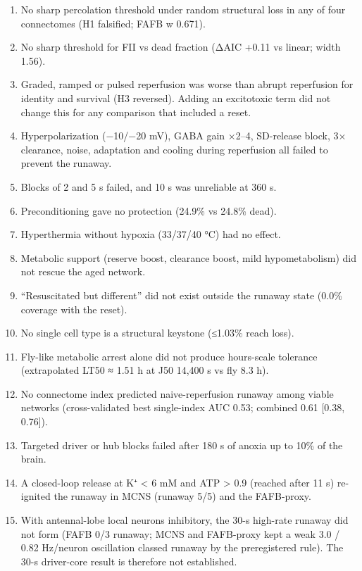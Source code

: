 \documentclass[11pt]{article}
\providecommand{\tightlist}{\setlength{\itemsep}{0pt}\setlength{\parskip}{0pt}}
\begin{document}
\begin{enumerate}
\def\labelenumi{\arabic{enumi}.}
\tightlist
\item
  No sharp percolation threshold under random structural loss in any of four connectomes (H1 falsified; FAFB w 0.671).
\item
  No sharp threshold for FII vs dead fraction (ΔAIC +0.11 vs linear; width 1.56).
\item
  Graded, ramped or pulsed reperfusion was worse than abrupt reperfusion for identity and survival (H3 reversed). Adding an excitotoxic term did not change this for any comparison that included a reset.
\item
  Hyperpolarization (−10/−20 mV), GABA gain ×2--4, SD-release block, 3× clearance, noise, adaptation and cooling during reperfusion all failed to prevent the runaway.
\item
  Blocks of 2 and 5 s failed, and 10 s was unreliable at 360 s.
\item
  Preconditioning gave no protection (24.9\% vs 24.8\% dead).
\item
  Hyperthermia without hypoxia (33/37/40 °C) had no effect.
\item
  Metabolic support (reserve boost, clearance boost, mild hypometabolism) did not rescue the aged network.
\item
  ``Resuscitated but different'' did not exist outside the runaway state (0.0\% coverage with the reset).
\item
  No single cell type is a structural keystone (≤1.03\% reach loss).
\item
  Fly-like metabolic arrest alone did not produce hours-scale tolerance (extrapolated LT50 ≈ 1.51 h at J50 14,400 s vs fly 8.3 h).
\item
  No connectome index predicted naive-reperfusion runaway among viable networks (cross-validated best single-index AUC 0.53; combined 0.61 {[}0.38, 0.76{]}).
\item
  Targeted driver or hub blocks failed after 180 s of anoxia up to 10\% of the brain.
\item
  A closed-loop release at K⁺ \textless{} 6 mM and ATP \textgreater{} 0.9 (reached after 11 s) re-ignited the runaway in MCNS (runaway 5/5) and the FAFB-proxy.
\item
  With antennal-lobe local neurons inhibitory, the 30-s high-rate runaway did not form (FAFB 0/3 runaway; MCNS and FAFB-proxy kept a weak 3.0 / 0.82 Hz/neuron oscillation classed runaway by the preregistered rule). The 30-s driver-core result is therefore not established.
\end{enumerate}
\end{document}
